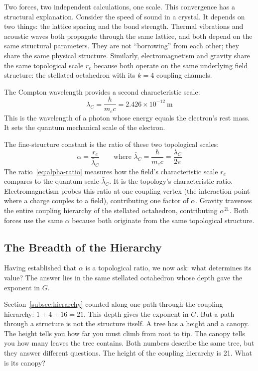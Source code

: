 \documentclass[aps,prd,preprint,superscriptaddress,showpacs,preprintnumbers,amsmath,amssymb,nofootinbib]{revtex4-2}
\begin{document}
Two forces, two independent calculations, one scale. This convergence has a structural explanation. Consider the speed of sound in a crystal. It depends on two things: the lattice spacing and the bond strength. Thermal vibrations and acoustic waves both propagate through the same lattice, and both depend on the same structural parameters. They are not ``borrowing'' from each other; they share the same physical structure. Similarly, electromagnetism and gravity share the same topological scale $r_e$ because both operate on the same underlying field structure: the stellated octahedron with its $k = 4$ coupling channels.

The Compton wavelength provides a second characteristic scale:
\begin{equation}
\lambda_C = \frac{h}{m_e c} = 2.426 \times 10^{-12}~\text{m}
\end{equation}
This is the wavelength of a photon whose energy equals the electron's rest mass. It sets the quantum mechanical scale of the electron.

The fine-structure constant is the ratio of these two topological scales:
\begin{equation}
\alpha = \frac{r_e}{\bar{\lambda}_C} \qquad \text{where } \bar{\lambda}_C = \frac{\hbar}{m_e c} = \frac{\lambda_C}{2\pi}
\label{eq:alpha-ratio}
\end{equation}
The ratio~\eqref{eq:alpha-ratio} measures how the field's characteristic scale $r_e$ compares to the quantum scale $\bar{\lambda}_C$. It is the topology's characteristic ratio. Electromagnetism probes this ratio at one coupling vertex (the interaction point where a charge couples to a field), contributing one factor of $\alpha$. Gravity traverses the entire coupling hierarchy of the stellated octahedron, contributing $\alpha^{21}$. Both forces use the same $\alpha$ because both originate from the same topological structure.

\subsection{The Breadth of the Hierarchy}
\label{subsec:breadth}

Having established that $\alpha$ is a topological ratio, we now ask: what determines its value? The answer lies in the same stellated octahedron whose depth gave the exponent in $G$.

Section~\ref{subsec:hierarchy} counted along one path through the coupling hierarchy: $1 + 4 + 16 = 21$. This depth gives the exponent in $G$. But a path through a structure is not the structure itself. A tree has a height and a canopy. The height tells you how far you must climb from root to tip. The canopy tells you how many leaves the tree contains. Both numbers describe the same tree, but they answer different questions. The height of the coupling hierarchy is 21. What is its canopy?
\end{document}
